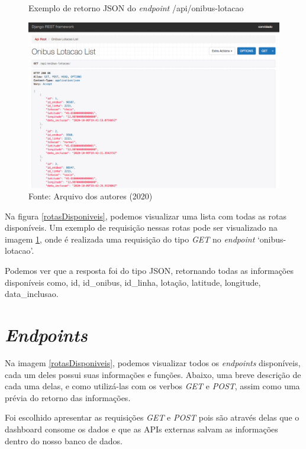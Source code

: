 \begin{figure}[H]
    \centering
    \caption{Exemplo de retorno JSON do \textit{endpoint} /api/onibus-lotacao}
    \includegraphics[width=1.0\linewidth]{Imagens/onibusLotacaoExemplo.png}
    \caption*{Fonte: Arquivo dos autores (2020)}
    \label{onibusLotacaoExemplo}
\end{figure}
\indent
\par Na figura \ref{rotasDisponiveis}, podemos visualizar uma lista com todas as rotas disponíveis. Um exemplo de requisição nessas rotas pode ser visualizado na imagem \ref{onibusLotacaoExemplo}, onde é realizada uma requisição do tipo \textit{GET} no \textit{endpoint} ‘onibus-lotacao’. 
\indent
\par Podemos ver que a resposta foi do tipo JSON, retornando todas as informações disponíveis como, id, id\_onibus, id\_linha, lotação, latitude, longitude, data\_inclusao.

\section{\textit{Endpoints}}
\indent
\par Na imagem \ref{rotasDisponiveis}, podemos visualizar todos os \textit{endpoints} disponíveis, cada um deles possui suas informações e funções. Abaixo, uma breve descrição de cada uma delas, e como utilizá-las com os verbos \textit{GET} e \textit{POST}, assim como uma prévia do retorno das informações.
\indent
\par Foi escolhido apresentar as requisições \textit{GET} e \textit{POST} pois são através delas que o dashboard consome os dados e que as APIs externas salvam as informações dentro do nosso banco de dados.

